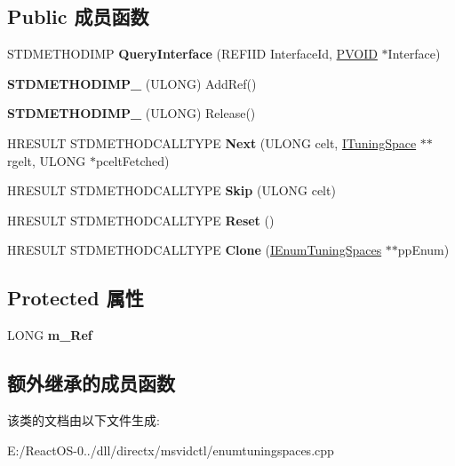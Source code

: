 \subsection*{Public 成员函数}
\begin{DoxyCompactItemize}
\item 
\mbox{\label{class_c_enum_tuning_spaces_a14c964525bbf2798e78a5f72075c5e1a}} 
S\+T\+D\+M\+E\+T\+H\+O\+D\+I\+MP {\bfseries Query\+Interface} (R\+E\+F\+I\+ID Interface\+Id, \hyperlink{interfacevoid}{P\+V\+O\+ID} $\ast$Interface)
\item 
\mbox{\label{class_c_enum_tuning_spaces_a7997a8951fde3830894eb2060adc3101}} 
{\bfseries S\+T\+D\+M\+E\+T\+H\+O\+D\+I\+M\+P\+\_\+} (U\+L\+O\+NG) Add\+Ref()
\item 
\mbox{\label{class_c_enum_tuning_spaces_ac737c857839e1f7e1053ace3b963d3ea}} 
{\bfseries S\+T\+D\+M\+E\+T\+H\+O\+D\+I\+M\+P\+\_\+} (U\+L\+O\+NG) Release()
\item 
\mbox{\label{class_c_enum_tuning_spaces_adcba2718441859e4081ed57b9e159fa5}} 
H\+R\+E\+S\+U\+LT S\+T\+D\+M\+E\+T\+H\+O\+D\+C\+A\+L\+L\+T\+Y\+PE {\bfseries Next} (U\+L\+O\+NG celt, \hyperlink{interface_i_tuning_space}{I\+Tuning\+Space} $\ast$$\ast$rgelt, U\+L\+O\+NG $\ast$pcelt\+Fetched)
\item 
\mbox{\label{class_c_enum_tuning_spaces_a2cb3470df63aba36028712f73f4ce7d8}} 
H\+R\+E\+S\+U\+LT S\+T\+D\+M\+E\+T\+H\+O\+D\+C\+A\+L\+L\+T\+Y\+PE {\bfseries Skip} (U\+L\+O\+NG celt)
\item 
\mbox{\label{class_c_enum_tuning_spaces_ad6379ffcb644c561b7d575d07bae679e}} 
H\+R\+E\+S\+U\+LT S\+T\+D\+M\+E\+T\+H\+O\+D\+C\+A\+L\+L\+T\+Y\+PE {\bfseries Reset} ()
\item 
\mbox{\label{class_c_enum_tuning_spaces_af4a8271f68779ffe31b506b0b89fd6e6}} 
H\+R\+E\+S\+U\+LT S\+T\+D\+M\+E\+T\+H\+O\+D\+C\+A\+L\+L\+T\+Y\+PE {\bfseries Clone} (\hyperlink{interface_i_enum_tuning_spaces}{I\+Enum\+Tuning\+Spaces} $\ast$$\ast$pp\+Enum)
\end{DoxyCompactItemize}
\subsection*{Protected 属性}
\begin{DoxyCompactItemize}
\item 
\mbox{\label{class_c_enum_tuning_spaces_aff67e3780756b926b134adc8351f2a2e}} 
L\+O\+NG {\bfseries m\+\_\+\+Ref}
\end{DoxyCompactItemize}
\subsection*{额外继承的成员函数}


该类的文档由以下文件生成\+:\begin{DoxyCompactItemize}
\item 
E\+:/\+React\+O\+S-\/0../dll/directx/msvidctl/enumtuningspaces.\+cpp\end{DoxyCompactItemize}
